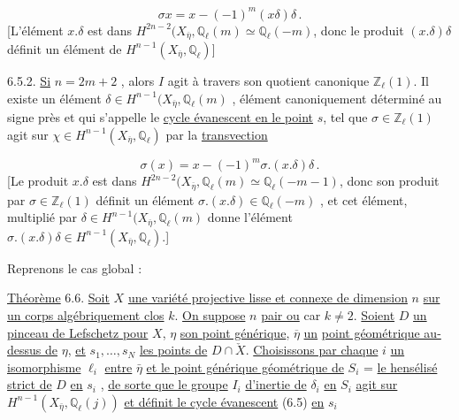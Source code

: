 \begin{equation*}
\sigma x = x - (-1)^m (x\delta)\delta \, .
\end{equation*}
[L'élément $x.\delta$ est dans $H^{2n-2}(X_{\overline{\eta}},\mathbb{Q}_\ell(m) \simeq \mathbb{Q}_\ell(-m)$, donc le produit $(x.\delta)\delta$ définit un élément de $H^{n-1}(X_{\overline{\eta}},\mathbb{Q}_\ell)$]

6.5.2. \underline{Si} $n = 2m + 2$ , alors $I$ agit à travers son quotient canonique $\mathbb{Z}_\ell(1)$. Il existe un élément $\delta \in H^{n-1}(X_{\overline{\eta}},\mathbb{Q}_\ell(m)$ , élément canoniquement déterminé au signe près et qui s'appelle le \underline{cycle évanescent en le point} $s$, tel que $\sigma \in \mathbb{Z}_\ell(1)$ agit sur $\chi \in H^{n-1}(X_{\overline{\eta}},\mathbb{Q}_\ell)$ par la \underline{transvection}

\begin{equation}\tag{6.5.2.1}
\sigma(x) = x - (-1)^m \sigma.(x.\delta)\delta \, .
\end{equation}
[Le produit $x.\delta$ est dans $H^{2n-2}(X_{\overline{\eta}},\mathbb{Q}_\ell(m) \simeq \mathbb{Q}_\ell(-m-1)$, donc son produit par $\sigma \in \mathbb{Z}_\ell(1)$ définit un élément $\sigma.(x.\delta) \in \mathbb{Q}_\ell(-m)$ , et cet élément, multiplié par $\delta \in H^{n-1}(X_{\overline{\eta}},\mathbb{Q}_\ell(m)$ donne l'élément $\sigma.(x.\delta)\delta \in H^{n-1}(X_{\overline{\eta}},\mathbb{Q}_\ell).$]

Reprenons le cas global :

\underline{Théorème} 6.6. \underline{Soit} $X$ \underline{une variété projective lisse et connexe de dimension} $n$ \underline{sur un corps algébriquement clos} $k$. \underline{On suppose} $n$ \underline{pair ou} car $k \neq 2$. \underline{Soient} $D$ \underline{un pinceau de Lefschetz pour} $X$, $\eta$ \underline{son point générique}, $\overline{\eta}$ \underline{un}
\underline{point géométrique au-dessus de} $\eta$, \underline{et} $s_{1},\ldots,s_{N}$ \underline{les points de} $D \cap \check{X}$. \underline{Choisissons par chaque} $i$ \underline{un isomorphisme} $\ell_{i}$ \underline{entre} $\bar{\eta}$ \underline{et le point générique géométrique de} $S_{i}$ = \underline{le hensélisé strict de} $D$ \underline{en} $s_{i}$ , \underline{de sorte que le groupe} $I_{i}$ \underline{d'inertie de} $\delta_{i}$ \underline{en} $S_{i}$ \underline{agit sur} $H^{n-1}(X_{\bar{\eta}},\mathbb{Q}_{\ell}(j))$ \underline{et définit le cycle évanescent} (6.5) \underline{en} $s_{i}$

